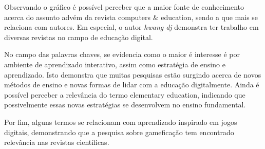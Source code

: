 Observando o gráfico é possível perceber que a maior fonte de conhecimento acerca do assunto advém da revista computers & education, sendo a que mais se relaciona com autores. Em especial, o autor \textit{hwang dj} demonstra ter trabalho em diversas revistas no campo de educação digital.

No campo das palavras chaves, se evidencia como o maior é interesse é por ambiente de aprendizado interativo, assim como estratégia de ensino e aprendizado. Isto demonstra que muitas pesquisas estão surgindo acerca de novos métodos de ensino e novas formas de lidar com a educação digitalmente. Ainda é possível perceber a relevância do termo elementary education, indicando que possivelmente essas novas estratégias se desenvolvem no ensino fundamental.

Por fim, alguns termos se relacionam com aprendizado inspirado em jogos digitais, demonstrando que a pesquisa sobre gameficação tem encontrado relevância nas revistas científicas.



